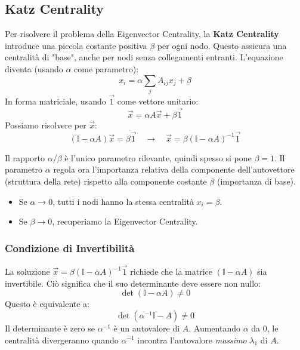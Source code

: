 	\subsection{Katz Centrality}
	Per risolvere il problema della Eigenvector Centrality, la \textbf{Katz Centrality} introduce una piccola costante positiva $\beta$ per ogni nodo. Questo assicura una centralità di "base", anche per nodi senza collegamenti entranti. L'equazione diventa (usando $\alpha$ come parametro):
    \begin{equation}
        x_i = \alpha \sum_{j} A_{ij} x_j + \beta
    \end{equation}
    In forma matriciale, usando $\vec{1}$ come vettore unitario:
    \begin{equation}
        \vec{x} = \alpha A \vec{x} + \beta \vec{1}
    \end{equation}
	Possiamo risolvere per $\vec{x}$:
    \begin{equation}
       (\mathbb{I} - \alpha A) \vec{x} = \beta \vec{1} \quad 
	\longrightarrow \quad \vec{x} = \beta (\mathbb{I} - \alpha A)^{-1} \vec{1} 
    \end{equation}
	
	Il rapporto $\alpha / \beta$ è l'unico parametro rilevante, quindi spesso si pone $\beta = 1$. Il parametro $\alpha$ regola ora l'importanza relativa della componente dell'autovettore (struttura della rete) rispetto alla componente costante $\beta$ (importanza di base).
	\begin{itemize}
		\item Se $\alpha \to 0$, tutti i nodi hanno la stessa centralità $x_i = \beta$.
		\item Se $\beta \to 0$, recuperiamo la Eigenvector Centrality.
	\end{itemize}
	
	\subsubsection{Condizione di Invertibilità}
	La soluzione $\vec{x} = \beta (\mathbb{I} - \alpha A)^{-1} \vec{1}$ richiede che la matrice $(\mathbb{I} - \alpha A)$ sia invertibile.
	Ciò significa che il suo determinante deve essere non nullo:
	\begin{equation}
	  \det(\mathbb{I} - \alpha A) \neq 0 
	\end{equation}	
	Questo è equivalente a:
	\begin{equation}
	    \det(\alpha^{-1} \mathbb{I} - A) \neq 0
	\end{equation}
	Il determinante è zero se $\alpha^{-1}$ è un autovalore di $A$. Aumentando $\alpha$ da 0, le centralità divergeranno quando $\alpha^{-1}$ incontra l'autovalore \textit{massimo} $\lambda_1$ di $A$.
	

